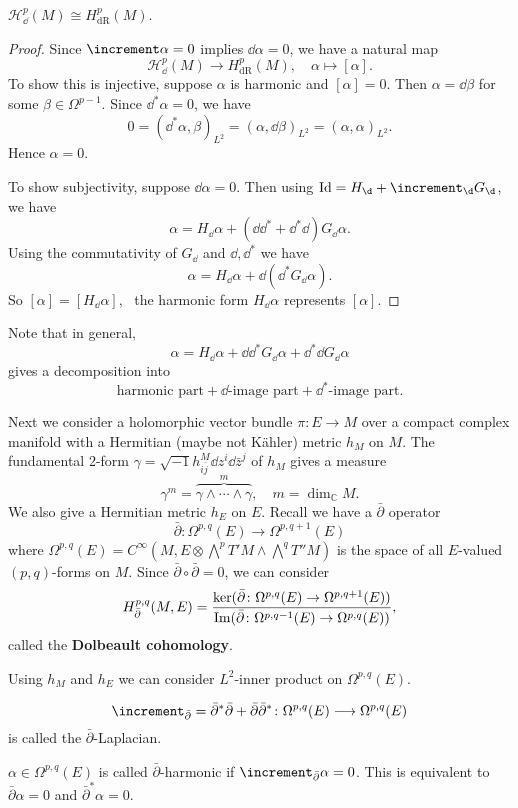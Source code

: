 \documentclass[12pt]{article}
\begin{document}
\begin{theorem}
  \(\mathcal{H}_{\dd{}}^p(M)\cong H_{\mathrm{dR}}^p(M)\).
\end{theorem}
\begin{proof}
  Since \(\lap\alpha=0\) implies \(\dd{\alpha}=0\), we have a natural map \[
    \mathcal{H}_{\dd{}}^p(M)\longrightarrow H_{\mathrm{dR}}^p(M),\quad
    \alpha\longmapsto [\alpha]
  .\] To show this is injective, suppose \(\alpha\) is harmonic and \([\alpha]=0\).
  Then \(\alpha=\dd{\beta}\) for some \(\beta\in \Omega^{p-1}\). Since \(\dd^*\alpha=0
  \), we have \[
    0=(\dd^*\alpha,\beta)_{L^2}=(\alpha,\dd{\beta})_{L^2}=(\alpha,\alpha)_{L^2}
  .\] Hence \(\alpha=0\).

  To show subjectivity, suppose \(\dd{\alpha}=0\). Then using
  \(\op{Id}=H_{\dd{}}+\lap_{\dd{}}G_{\dd{}}\), we have \[
    \alpha=H_{\dd{}}\alpha+(\dd \dd^*+\dd^*\dd)G_{\dd{}}\alpha
  .\] Using the commutativity of \(G_{\dd{}}\) and \(\dd,\dd^*\) we have \[
    \alpha=H_{\dd{}}\alpha+\dd{(\dd^*G_{\dd{}}\alpha)}
  .\] So \([\alpha]=[H_{\dd{}}\alpha]\), \ie\ the harmonic form \(H_{\dd{}}\alpha\)
  represents \([\alpha]\).
\end{proof}
Note that in general, \[
  \alpha=H_{\dd{}}\alpha+\dd \dd^*G_{\dd{}}\alpha+\dd^*\dd G_{\dd{}}\alpha
\] gives a decomposition into \[
  \text{harmonic part}+\dd\text{-image part}+\dd^*\text{-image part}
.\] 

Next we consider a holomorphic vector bundle \(\pi\colon E\to M\) over a compact
complex manifold with a Hermitian (maybe not K\"ahler) metric \(h_{M}\) on \(M\).
The fundamental 2-form \(\gamma=\sqrt{-1}h^M_{i\bar{j}}\dd{z^i}\dd{\bar{z}^j}\) of
\(h_M\) gives a measure \[
  \gamma^m=\overbrace{\gamma\wedge \cdots \wedge \gamma}^m,\quad m=\dim_{\mathbb{C}}M
.\] We also give a Hermitian metric \(h_E\) on \(E\). Recall we have a
\(\bar{\partial}\) operator \[
  \bar{\partial}\colon \Omega^{p,q}(E)\longrightarrow\Omega^{p,q+1}(E)
\] where \(\Omega^{p,q}(E)=C^\infty(M,E\otimes\bigwedge^p T'M\wedge\bigwedge^q T''M)\)
is the space of all \(E\)-valued \((p,q)\)-forms on \(M\). Since
\(\bar{\partial}\circ \bar{\partial}=0\), we can consider \[
  H_{\bar{\partial}}^{p,q}(M,E)
  =\frac{\ker(\bar{\partial}\colon \Omega^{p,q}(E)\to \Omega^{p,q+1}(E))}
  {\operatorname{Im}(\bar{\partial}\colon \Omega^{p,q-1}(E)\to \Omega^{p,q}(E))},
\] called the \textbf{Dolbeault cohomology}.

Using \(h_M\) and \(h_E\) we can consider \(L^2\)-inner product on \(\Omega^{p,q}(E)\).

\begin{definition}
  \[
    \lap_{\bar{\partial}}=\bar{\partial}^*\bar{\partial}+\bar{\partial}\bar{\partial}^*
    \colon \Omega^{p,q}(E)\longrightarrow\Omega^{p,q}(E)
  \]  is called the \(\bar{\partial}\)-Laplacian.
\end{definition}
\begin{definition}
  \(\alpha\in \Omega^{p,q}(E)\) is called \(\bar{\partial}\)-harmonic if 
  \(\lap_{\bar{\partial}}\alpha=0\). This is equivalent to \(\bar{\partial}\alpha=0\)
  and \(\bar{\partial}^*\alpha=0\).
\end{definition}
\end{document}
